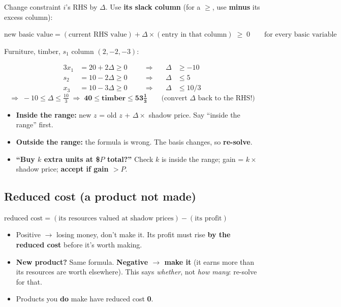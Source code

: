 \documentclass[10pt,a4paper]{article}
\newcommand{\Ge}{\ensuremath{\geq}}
\begin{document}
Change constraint $i$'s RHS by $\Delta$. Use \textbf{its slack column} (for a \Ge, use \textbf{minus} its excess column):
\begin{workline}
$\text{new basic value} = (\text{current RHS value}) + \Delta \times (\text{entry in that column}) \;\geq\; 0 \qquad \text{for every basic variable}$
\end{workline}
Furniture, timber, $s_1$ column $(2, -2, -3)$:
\begin{work}
\begin{alignat*}{3}
x_1 &= 20 + 2\Delta \geq 0 &\quad&\Rightarrow\quad& \Delta &\geq -10 \\
s_2 &= 10 - 2\Delta \geq 0 &&\Rightarrow& \Delta &\leq 5 \\
x_3 &= 10 - 3\Delta \geq 0 &&\Rightarrow& \Delta &\leq 10/3
\end{alignat*}
\[
\Rightarrow\; -10 \leq \Delta \leq \tfrac{10}{3} \;\Rightarrow\; \mathbf{40 \leq \text{timber} \leq 53\tfrac13} \qquad \text{(convert $\Delta$ back to the RHS!)}
\]
\end{work}
\begin{itemize}
  \item \textbf{Inside the range:} new $z$ = old $z$ + $\Delta \times$ shadow price. Say ``inside the range'' first.
  \item \textbf{Outside the range:} the formula is wrong. The basis changes, so \textbf{re-solve}.
  \item \textbf{``Buy $k$ extra units at \$$P$ total?''} Check $k$ is inside the range; gain = $k \times$ shadow price; \textbf{accept if gain $> P$}.
\end{itemize}

\subsection{Reduced cost (a product not made)}

\begin{workline}
$\text{reduced cost} = (\text{its resources valued at shadow prices}) - (\text{its profit})$
\end{workline}
\begin{itemize}
  \item Positive $\to$ losing money, don't make it. Its profit must rise \textbf{by the reduced cost} before it's worth making.
  \item \textbf{New product?} Same formula. \textbf{Negative $\to$ make it} (it earns more than its resources are worth elsewhere). This says \emph{whether}, not \emph{how many}: re-solve for that.
  \item Products you \textbf{do} make have reduced cost \textbf{0}.
\end{itemize}
\end{document}
